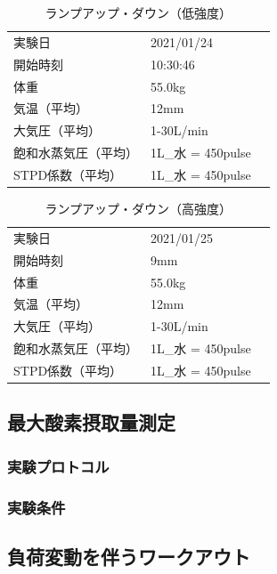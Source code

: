 \begin{table}[h]
  \begin{center}
  \caption{ランプアップ・ダウン（低強度）}
  \label{tb:YFS201_specsheet}
    \begin{tabular}{ll}
      実験日 & 2021/01/24 \\
      開始時刻 & 10:30:46 \\
      体重 & 55.0kg \\
      気温（平均） & 12mm \\
      大気圧（平均） & 1-30L/min \\
      飽和水蒸気圧（平均） & 1L_{水} = 450pulse　\\
      STPD係数（平均） & 1L_{水} = 450pulse
    \end{tabular}
  \end{center}
\end{table}

\begin{table}[h]
  \begin{center}
  \caption{ランプアップ・ダウン（高強度）}
  \label{tb:YFS201_specsheet}
    \begin{tabular}{ll}
      実験日 & 2021/01/25 \\
      開始時刻 & 9mm \\
      体重 & 55.0kg \\
      気温（平均） & 12mm \\
      大気圧（平均） & 1-30L/min \\
      飽和水蒸気圧（平均） & 1L_{水} = 450pulse　\\
      STPD係数（平均） & 1L_{水} = 450pulse
    \end{tabular}
  \end{center}
\end{table}

\subsection{最大酸素摂取量測定}

\subsubsection{実験プロトコル}

\subsubsection{実験条件}

\subsection{負荷変動を伴うワークアウト}


